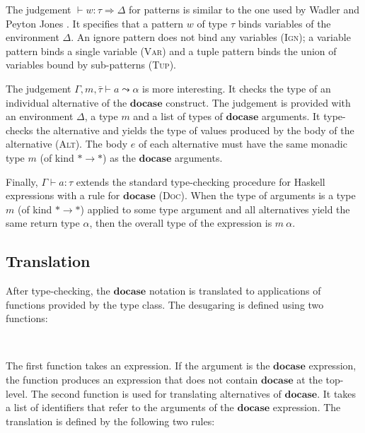 \documentclass{sigplanconf}
\newcommand{\Varid}[1]{\mathit{#1}}
\def\resethooks{%
  \global\let\SaveRestoreHook\empty
  \global\let\ColumnHook\empty}
\let\hspre\empty
\let\hspost\empty
\begin{document}
The judgement $\vdash w : \tau \Rightarrow \Delta$ for patterns is similar to the one used by
Wadler and Peyton Jones \cite{groupordercompre}. It specifies that a pattern $w$ of type $\tau$ binds 
variables of the environment $\Delta$. An ignore pattern does not bind any variables (\textsc{Ign}); 
a variable pattern binds a single variable (\textsc{Var}) and a tuple pattern binds the union of 
variables bound by sub-patterns (\textsc{Tup}).

The judgement $\Gamma, m, \bar{\tau} \vdash a \leadsto \alpha $ is more interesting. It 
checks the type of an individual alternative of the \ensuremath{\mathbf{docase}} construct. The judgement is provided 
with an environment $\Delta$, a  type $m$ and a list of types of 
\ensuremath{\mathbf{docase}} arguments. It type-checks the alternative and yields the type of values produced by the
body of the alternative (\textsc{Alt}). The body $e$ of each alternative must have the same monadic 
type $m$ (of kind \ensuremath{\mathbin{*}\to \mathbin{*}}) as the \ensuremath{\mathbf{docase}} arguments. 

Finally, $\Gamma \vdash a : \tau$ extends the standard type-checking procedure
for Haskell expressions with a rule for \ensuremath{\mathbf{docase}} (\textsc{Doc}). When the type of arguments is 
a  type $m$ (of kind \ensuremath{\mathbin{*}\to \mathbin{*}}) applied to some type argument and all 
alternatives yield the same return type $\alpha$, then the overall type of the expression is 
$m \ \alpha$.


\subsection{Translation}
\label{sec:extension-translation}

After type-checking, the \ensuremath{\mathbf{docase}} notation is translated to applications of functions provided by the 
 type class. The desugaring is defined using two functions:

\begin{hscode}\SaveRestoreHook
\column{B}{@{}>{\hspre}l<{\hspost}@{}}%
\column{11}{@{}>{\hspre}l<{\hspost}@{}}%
\column{E}{@{}>{\hspre}l<{\hspost}@{}}%
\>[B]{}\Varid{d} \mathopen{\langle} \mathbin{-}\mathclose{\rangle} {}\<[11]%
\>[11]{}\mathbin{::}\Varid{e}\to \Varid{e}{}\<[E]%
\\
\>[B]{}\Varid{c} \mathopen{\langle} \mathbin{-}\mathclose{\rangle} {}\<[11]%
\>[11]{}\mathbin{::}\Varid{a}\to [\mskip1.5mu \Varid{id}\mskip1.5mu]\to \Varid{e}{}\<[E]%
\ColumnHook
\end{hscode}\resethooks
The first function takes an expression. If the argument is the \ensuremath{\mathbf{docase}} expression, the function
produces an expression that does not contain \ensuremath{\mathbf{docase}} at the top-level. The second function is used
for translating alternatives of \ensuremath{\mathbf{docase}}. It takes a list of identifiers that refer to the arguments
of the \ensuremath{\mathbf{docase}} expression. The translation is defined by the following two rules:
\end{document}
